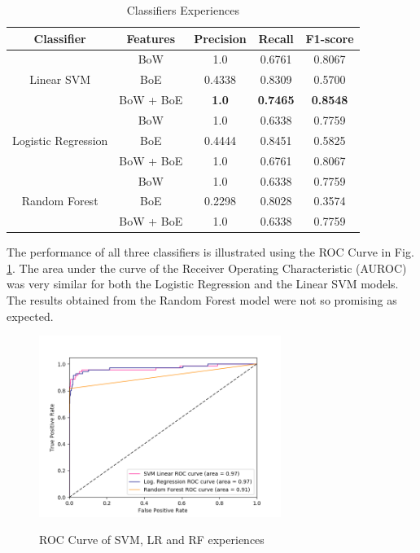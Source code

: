 \begin{table}[!htbp]
\footnotesize
\centering
\caption{Classifiers Experiences}
\label{classifiers}
\begin{tabular}{|c|c|c|c|c|}
\hline
\textbf{Classifier}                  & \textbf{Features} & \textbf{Precision} & \textbf{Recall} & \textbf{F1-score} \\ \hline
\multirow{3}{*}{Linear SVM}          & BoW               & 1.0                & 0.6761          & 0.8067            \\
                                     & BoE               & 0.4338             & 0.8309          & 0.5700            \\
                                     & BoW + BoE         & \textbf{1.0}       & \textbf{0.7465} & \textbf{0.8548}   \\ \hline
\multirow{3}{*}{Logistic Regression} & BoW               & 1.0                & 0.6338          & 0.7759            \\
                                     & BoE               & 0.4444             & 0.8451          & 0.5825            \\
                                     & BoW + BoE         & 1.0                & 0.6761          & 0.8067            \\ \hline
\multirow{3}{*}{Random Forest}       & BoW               & 1.0                & 0.6338          & 0.7759            \\
                                     & BoE               & 0.2298             & 0.8028          & 0.3574            \\
                                     & BoW + BoE         & 1.0                & 0.6338          & 0.7759            \\ \hline
\end{tabular}
\end{table}

The performance of all three classifiers is illustrated using the ROC Curve in Fig. \ref{fig:roc_curve}. The area under the curve of the Receiver Operating Characteristic (AUROC) was very similar for both the Logistic Regression and the Linear SVM models. The results obtained from the Random Forest model were not so promising as expected.

\begin{figure}[!htbp]
  \caption{ROC Curve of SVM, LR and RF experiences}
  \centering
  \includegraphics[width=0.7\textwidth]{figures/roc_auc_brazilian_travel_related}
  \label{fig:roc_curve}
\end{figure}

